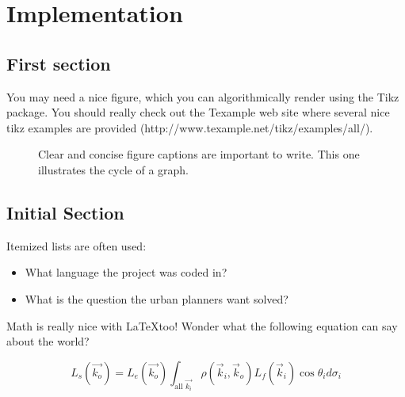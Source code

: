 \chapter{Implementation}
\label{chap:impl}

\section{First section}

You may need a nice figure, which you can algorithmically render using the Tikz package. You should really check out the Texample web site where several nice tikz examples are provided (http://www.texample.net/tikz/examples/all/).

\begin{figure}
\centering
{}
\caption{Clear and concise figure captions are important to write. This one illustrates the cycle of a graph.}
\label{fig:tikzexample}
\end{figure}

\section{Initial Section}

Itemized lists are often used:
\begin{itemize}
\item What language the project was coded in?
\item What is the question the urban planners want solved?
\end{itemize}
 
Math is really nice with \LaTeX too!  Wonder what the following equation can say about the world?

\[L_{s}(\vec{k_{o}}) = L_{e}(\vec{k_{o}}) \int_{\text{all $\vec{k_{i}}$}} \rho(\vec{k}_i,\vec{k}_o) L_f(\vec{k}_i) \cos\theta_i d\sigma_i \]

